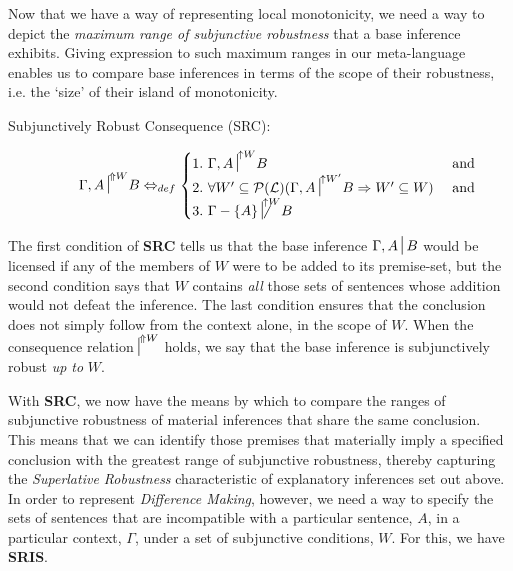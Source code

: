 \documentclass{article}
\newcommand{\nc}{\turnstile{s}{w}{}{}{n}}
\begin{document}
Now that we have a way of representing local monotonicity, we need a way to depict the \textit{maximum range of subjunctive robustness} that a base inference exhibits. Giving expression to such maximum ranges in our meta-language enables us to compare base inferences in terms of the scope of their robustness, i.e. the `size' of their island of monotonicity.

	\begin{description}
		\item[Subjunctively Robust Consequence (SRC):]
		  \begin{equation}
		      {\Gamma, A \nc}^{\Uparrow W}B \Leftrightarrow_{def} 
		      \begin{cases}\nonumber
		        1.\,\, {\Gamma, A \nc}^{\uparrow W} B & $ and $ \\
				2.\,\, \forall W' \subseteq\mathcal{P}(\mathcal{L}) ({\Gamma, A \nc}^{\uparrow W'}B \Rightarrow W' \subseteq W)  & $ and $\\ 
				3.\,\, {\Gamma -\{A\} \not\nc}^{\uparrow W} B & \\ 
				\end{cases}
		  \end{equation}

	\end{description}

The first condition of \textbf{SRC} tells us that the base inference $ \Gamma, A \nc B $ would be licensed if any of the members of  $W$ were to be added to its premise-set, but the second condition says that $W$ contains \textit{all} those sets of sentences whose addition would not defeat the inference. The last condition  ensures that the conclusion does not simply follow from the context alone, in the scope of $W$. When the consequence relation $ {\nc}^{\Uparrow W} $ holds, we say that the base inference is subjunctively robust \textit{up to} $ W $.

With \textbf{SRC}, we now have the means by which to compare the ranges of subjunctive robustness of material inferences that share the same conclusion. This means that we can identify those premises that materially imply a specified conclusion with the greatest range of subjunctive robustness, thereby capturing the \textit{Superlative Robustness} characteristic of explanatory inferences set out above. In order to represent \textit{Difference Making}, however, we need a way to specify the sets of sentences that are incompatible with a particular sentence, $A$, in a particular context, $\Gamma$,  under a set of subjunctive conditions, $W$. For this, we have \textbf{SRIS}.
\end{document}

